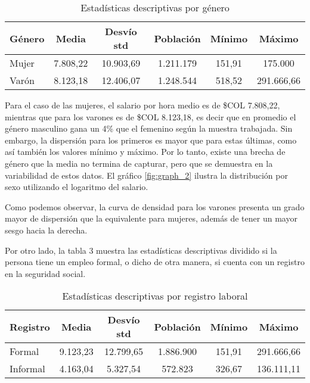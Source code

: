 \documentclass[11pt,oneside]{article}
\begin{document}
	\begin{table}[H]
\caption{Estadísticas descriptivas por género}
        \centering
		\begin{tabular}{lccccc}
			\hline
			\textbf{Género} & \textbf{Media} & \textbf{Desvío std} & \textbf{Población} & \textbf{Mínimo} & \textbf{Máximo} \\ \hline
			Mujer & 7.808,22 & 10.903,69 & 1.211.179 & 151,91 & 175.000 \\ 
			Varón & 8.123,18 & 12.406,07 & 1.248.544 & 518,52 & 291.666,66 \\ \hline
		\end{tabular}
		\label{tab:estadisticas_genero}
	\end{table}
	
	Para el caso de las mujeres, el salario por hora medio es de \$COL 7.808,22, mientras que para los varones es de \$COL 8.123,18, es decir que en promedio el género masculino gana un 4\% que el femenino según la muestra trabajada. Sin embargo, la dispersión para los primeros es mayor que para estas últimas, como así también los valores mínimo y máximo. Por lo tanto, existe una brecha de género que la media no termina de capturar, pero que se demuestra en la variabilidad de estos datos. El gráfico \ref{fig:graph_2} ilustra la distribución por sexo utilizando el logaritmo del salario. 
	
	Como podemos observar, la curva de densidad para los varones presenta un grado mayor de dispersión que la equivalente para mujeres, además de tener un mayor sesgo hacia la derecha.
	
	Por otro lado, la tabla 3 muestra las estadísticas descriptivas dividido si la persona tiene un empleo formal, o dicho de otra manera, si cuenta con un registro en la seguridad social.
	
	\begin{table}[H]
        \centering
        \caption{Estadísticas descriptivas por registro laboral}
		\begin{tabular}{lccccc}
			\hline
			\textbf{Registro} & \textbf{Media} & \textbf{Desvío std} & \textbf{Población} & \textbf{Mínimo} & \textbf{Máximo} \\ \hline
			Formal   & 9.123,23 & 12.799,65 & 1.886.900 & 151,91 & 291.666,66 \\ 
			Informal & 4.163,04 & 5.327,54  & 572.823   & 326,67 & 136.111,11 \\ \hline
		\end{tabular}
		\label{tab:estadisticas_registro}
	\end{table}
	
\end{document}
